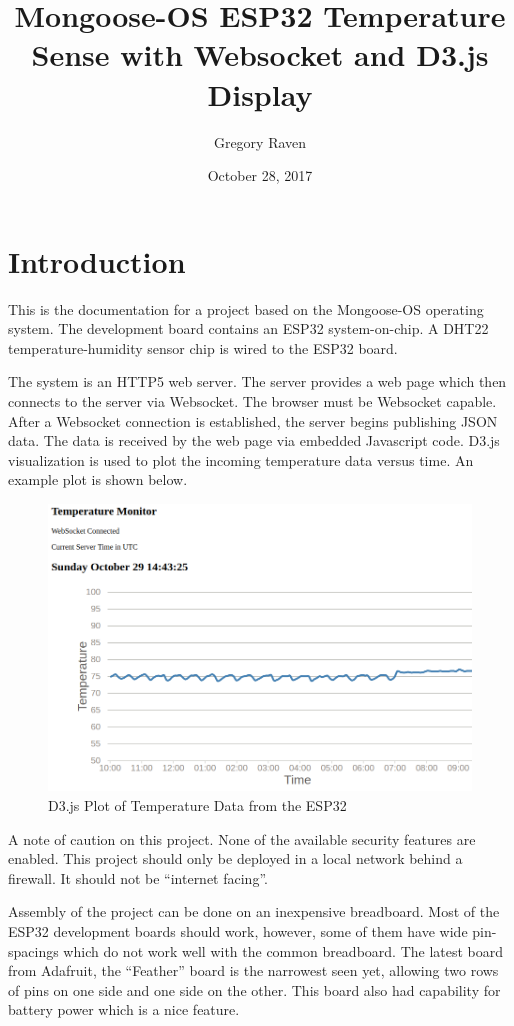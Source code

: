 \documentclass[oneside,letterpaper,12pt]{book}
\title{Mongoose-OS ESP32 Temperature Sense with Websocket and D3.js Display}
\author{Gregory Raven}
\date{October 28, 2017}
\begin{document}
\maketitle

{
\setcounter{tocdepth}{2}
\tableofcontents
}
\chapter{Introduction}\label{introduction}

This is the documentation for a project based on the Mongoose-OS
operating system. The development board contains an ESP32
system-on-chip. A DHT22 temperature-humidity sensor chip is wired to the
ESP32 board.

The system is an HTTP5 web server. The server provides a web page which
then connects to the server via Websocket. The browser must be Websocket
capable. After a Websocket connection is established, the server begins
publishing JSON data. The data is received by the web page via embedded
Javascript code. D3.js visualization is used to plot the incoming
temperature data versus time. An example plot is shown below.

\begin{figure}
\centering
\includegraphics{tempviz1.png}
\caption{D3.js Plot of Temperature Data from the ESP32}
\end{figure}

A note of caution on this project. None of the available security
features are enabled. This project should only be deployed in a local
network behind a firewall. It should not be ``internet facing''.

Assembly of the project can be done on an inexpensive breadboard. Most
of the ESP32 development boards should work, however, some of them have
wide pin-spacings which do not work well with the common breadboard. The
latest board from Adafruit, the ``Feather'' board is the narrowest seen
yet, allowing two rows of pins on one side and one side on the other.
This board also had capability for battery power which is a nice
feature.
\end{document}
